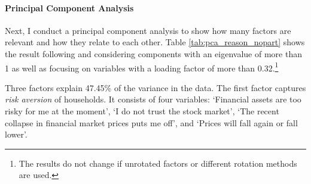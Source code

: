 \documentclass[ProjectABM]{subfiles}
\begin{document}





\paragraph{Principal Component Analysis}

Next, I conduct a principal component analysis to show how many factors are relevant and how they relate to each other. Table \ref{tab:pca_reason_nopart} shows the result following \cite{choi_2020} and \cite{tabachnick_fidell_2007} considering components with an eigenvalue of more than 1 as well as focusing on variables with a loading factor of more than 0.32.\footnote{The results do not change if unrotated factors or different rotation methods are used.}

Three factors explain 47.45\% of the variance in the data. The first factor captures \textit{risk aversion} of households. It consists of four variables: `Financial assets are too risky for me at the moment', `I do not trust the stock market', `The recent collapse in financial market prices puts me off', and `Prices will fall again or fall lower'. 
\end{document}

